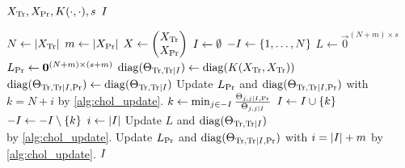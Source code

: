 \begin{algorithmic}[1]
  \REQUIRE \( X_{\text{Tr}}, X_{\text{Pr}}, K(\cdot, \cdot), s \)
  \ENSURE \( I \)

  \STATE \( N \gets \lvert X_{\text{Tr}}\rvert \)
  \STATE \( m \gets \lvert X_{\text{Pr}}\rvert \)
  \STATE \(
    X \gets
    \begin{pmatrix}
      X_{\text{Tr}} \\
      X_{\text{Pr}}
    \end{pmatrix}
  \)
  \STATE \( I \gets \emptyset \)
  \STATE \( -I \gets \{ 1, \dotsc, N \} \)
  \STATE \( L \gets \vec{0}^{(N + m) \times s} \)
  \STATE \( L_{\text{Pr}} \gets \bm{0}^{(N + m) \times (s + m)} \)
  \STATE \(
    \operatorname{diag}(\Theta_{\text{Tr}, \text{Tr} \mid I}) \gets
    \operatorname{diag}(K(X_{\text{Tr}}, X_{\text{Tr}}))
  \)
  \STATE \(
    \operatorname{diag}(\Theta_{\text{Tr}, \text{Tr} \mid I, \text{Pr}}) \gets
    \operatorname{diag}(\Theta_{\text{Tr}, \text{Tr} \mid I})
  \)
    \STATE Update \( L_{\text{Pr}} \) and \( \operatorname{diag}(\Theta_{\text{Tr}, \text{Tr}
      \mid I, \text{Pr}}) \) with \( k = N + i \) by \cref{alg:chol_update}.
  \ENDFOR
    \STATE \(
      k \gets \min_{j \in -I}
      \frac{\Theta_{j, j \mid I, \text{Pr}}}{\Theta_{j, j \mid I}}
    \)
    \STATE \( I \gets I \cup \{ k \} \)
    \STATE \( -I \gets -I \setminus \{ k \} \)
    \STATE \( i \gets \lvert I\rvert \)
    \STATE Update \( L \) and \( \operatorname{diag}(\Theta_{\text{Tr}, \text{Tr}
      \mid I}) \) \\ by \cref{alg:chol_update}.
    \STATE Update \( L_{\text{Pr}} \) and \( \operatorname{diag}(\Theta_{\text{Tr}, \text{Tr} \mid I,
      \text{Pr}}) \) with \( i = \lvert I\rvert + m \) by \cref{alg:chol_update}.
  \ENDWHILE
  \RETURN \( I \)
\end{algorithmic}
